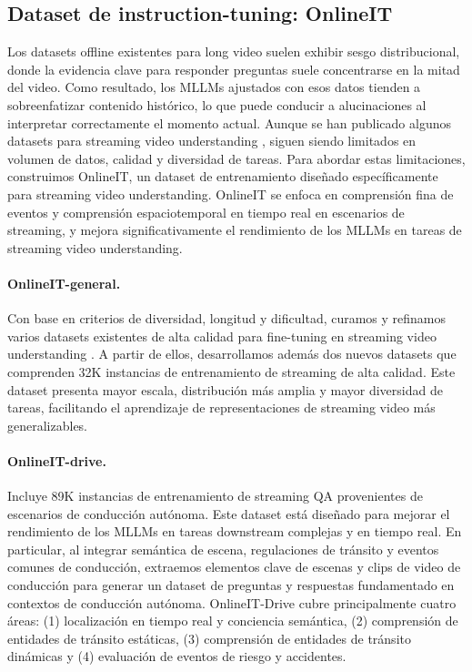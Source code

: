 \subsection{Dataset de instruction-tuning: OnlineIT}



Los datasets offline existentes para long video suelen exhibir sesgo distribucional, donde la evidencia clave para responder preguntas suele concentrarse en la mitad del video. Como resultado, los MLLMs ajustados con esos datos tienden a sobreenfatizar contenido histórico, lo que puede conducir a alucinaciones al interpretar correctamente el momento actual. Aunque se han publicado algunos datasets para streaming video understanding \cite{chen2024videollmonline,wang2024mmduet,yang2025svbench,qian2025dispider}, siguen siendo limitados en volumen de datos, calidad y diversidad de tareas. Para abordar estas limitaciones, construimos OnlineIT, un dataset de entrenamiento diseñado específicamente para streaming video understanding. OnlineIT se enfoca en comprensión fina de eventos y comprensión espaciotemporal en tiempo real en escenarios de streaming, y mejora significativamente el rendimiento de los MLLMs en tareas de streaming video understanding.



\paragraph{OnlineIT-general.} Con base en criterios de diversidad, longitud y dificultad, curamos y refinamos varios datasets existentes de alta calidad para fine-tuning en streaming video understanding \cite{huang2024videochatonline, wang2024mmduet, qian2025dispider}. A partir de ellos, desarrollamos además dos nuevos datasets que comprenden 32K instancias de entrenamiento de streaming de alta calidad. Este dataset presenta mayor escala, distribución más amplia y mayor diversidad de tareas, facilitando el aprendizaje de representaciones de streaming video más generalizables.

\paragraph{OnlineIT-drive.} Incluye 89K instancias de entrenamiento de streaming QA provenientes de escenarios de conducción autónoma. Este dataset está diseñado para mejorar el rendimiento de los MLLMs en tareas downstream complejas y en tiempo real. En particular, al integrar semántica de escena, regulaciones de tránsito y eventos comunes de conducción, extraemos elementos clave de escenas y clips de video de conducción para generar un dataset de preguntas y respuestas fundamentado en contextos de conducción autónoma. OnlineIT-Drive cubre principalmente cuatro áreas: (1) localización en tiempo real y conciencia semántica, (2) comprensión de entidades de tránsito estáticas, (3) comprensión de entidades de tránsito dinámicas y (4) evaluación de eventos de riesgo y accidentes.
